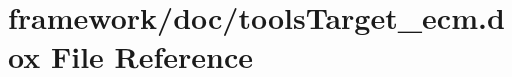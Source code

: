 \hypertarget{tools_target__ecm_8dox}{}\section{framework/doc/tools\+Target\+\_\+ecm.dox File Reference}
\label{tools_target__ecm_8dox}
